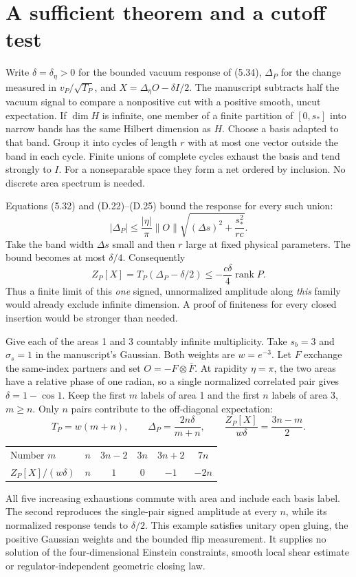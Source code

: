 \documentclass[12pt,a4paper]{article}
\newcommand{\topic}[1]{\section*{\color{ink}#1}}
\newcommand{\subtopic}[1]{\par\medskip{\large\bfseries #1}\par\nobreak}
\DeclareMathOperator{\rank}{rank}
\begin{document}
\clearpage
\topic{A sufficient theorem and a cutoff test}

Write $\delta=\delta_\eta>0$ for the bounded vacuum response of (5.34),
$\Delta_P$ for the change measured in $v_P/\sqrt{T_P}$, and
$X=\Delta_\eta O-\delta I/2$. The manuscript subtracts half the vacuum signal to compare a nonpositive cut with a positive smooth, uncut expectation. If $\dim H$ is infinite, one member of a finite partition of $[0,s_*]$ into narrow bands has the same Hilbert dimension as $H$. Choose a basis adapted to that band. Group it into cycles of length $r$ with at most one vector outside the band in each cycle. Finite unions of complete cycles exhaust the basis and tend strongly to $I$. For a nonseparable space they form a net ordered by inclusion. No discrete area spectrum is needed.

Equations (5.32) and (D.22)--(D.25) bound the response for every such union:
\[
 |\Delta_P|\le \frac{|\eta|}{\pi}\|O\|
 \sqrt{(\Delta s)^2+\frac{s_*^2}{rc}} .
\]
Take the band width $\Delta s$ small and then $r$ large at fixed physical parameters. The bound becomes at most $\delta/4$. Consequently
\[
 Z_P[X]=T_P(\Delta_P-\delta/2)
       \le -\frac{c\delta}{4}\rank P.
\]
Thus a finite limit of this \emph{one} signed, unnormalized amplitude along \emph{this} family would already exclude infinite dimension. A proof of finiteness for every closed insertion would be stronger than needed.

\subtopic{Five exhaustions of the same two-level operator}
Give each of the areas 1 and 3 countably infinite multiplicity. Take $s_b=3$ and $\sigma_s=1$ in the manuscript's Gaussian. Both weights are $w=e^{-3}$. Let $F$ exchange the same-index partners and set $O=-F\otimes\bar F$. At rapidity $\eta=\pi$, the two areas have a relative phase of one radian, so a single normalized correlated pair gives $\delta=1-\cos 1$. Keep the first $m$ labels of area 1 and the first $n$ labels of area 3, $m\ge n$. Only $n$ pairs contribute to the off-diagonal expectation:
\[
 T_P=w(m+n),\qquad \Delta_P=\frac{2n\delta}{m+n},\qquad
 \frac{Z_P[X]}{w\delta}=\frac{3n-m}{2}.
\]
\begin{center}\renewcommand{\arraystretch}{1.23}
\begin{tabular}{lccccc}
\hline
Number $m$ & $n$ & $3n-2$ & $3n$ & $3n+2$ & $7n$\\
$Z_P[X]/(w\delta)$ & $n$ & $1$ & $0$ & $-1$ & $-2n$\\
\hline
\end{tabular}
\end{center}
All five increasing exhaustions commute with area and include each basis label. The second reproduces the single-pair signed amplitude at every $n$, while its normalized response tends to $\delta/2$. This example satisfies unitary open gluing, the positive Gaussian weights and the bounded flip measurement. It supplies no solution of the four-dimensional Einstein constraints, smooth local shear estimate or regulator-independent geometric closing law.
\end{document}
